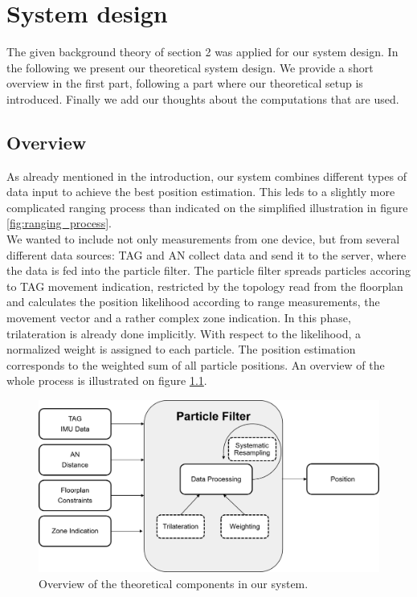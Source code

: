 
\chapter{System design} %

\label{Chapter4} %
The given background theory of section 2 was applied for our system design. In the following we present our theoretical system design. We provide a short overview in the first part, following a part where our theoretical setup is introduced. Finally we add our thoughts about the computations that are used.


\section{Overview}
As already mentioned in the introduction, our system combines different types of data input to achieve the best position estimation. This leds to a slightly more complicated ranging process than indicated on the simplified illustration in figure \ref{fig:ranging_process}.\\
We wanted to include not only measurements from one device, but from several different data sources:
TAG and AN collect data and send it to the server, where the data is fed into the particle filter. The particle filter spreads particles accoring to TAG movement indication, restricted by the topology read from the floorplan and calculates the position likelihood according to range measurements, the movement vector and a rather complex zone indication. In this phase, trilateration is already done implicitly. With respect to the likelihood, a normalized weight is assigned to each particle. The position estimation corresponds to the weighted sum of all particle positions.
An overview of the whole process is illustrated on figure \ref{fig:particle_filter_design}.

\begin{figure}[th]
\centering
\includegraphics[width=1.0\textwidth]{Figures/particle_filter_design}
\decoRule
\caption[Particle filter design]{Overview of the theoretical components in our system.}
\label{fig:particle_filter_design}
\end{figure}


